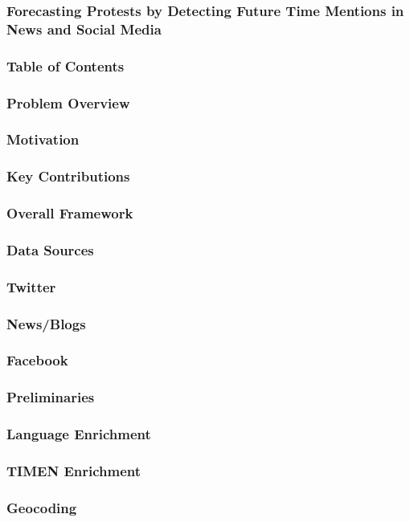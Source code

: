 \documentclass{beamer}
\begin{document}
\begin{frame}
\frametitle{Forecasting Protests by Detecting Future Time Mentions in News and Social Media
}
\end{frame}

\begin{frame}
\frametitle{Table of Contents}
\tableofcontents[currentsection]
\end{frame}


\begin{frame}
\frametitle{Problem Overview}
\end{frame}

\begin{frame}
\frametitle{Motivation}
\end{frame}


\begin{frame}
\frametitle{Key Contributions}
\end{frame}


\begin{frame}
\frametitle{Overall Framework}
\end{frame}

\begin{frame}
    \frametitle{Data Sources}
\end{frame}

\begin{frame}
    \frametitle{Twitter}
\end{frame}

\begin{frame}
    \frametitle{News/Blogs}
\end{frame}

\begin{frame}
    \frametitle{Facebook}
\end{frame}


\begin{frame}
\frametitle{Preliminaries}
\end{frame}

\begin{frame}
    \frametitle{Language Enrichment}
\end{frame}

\begin{frame}
\frametitle{TIMEN Enrichment}
\end{frame}


\begin{frame}
\frametitle{Geocoding}
\end{frame}
\end{document}

